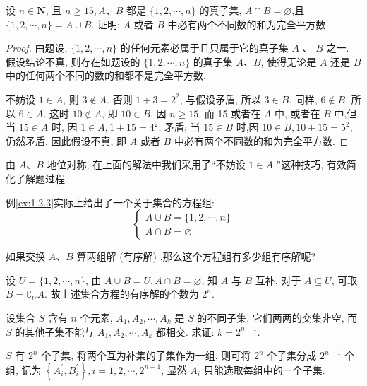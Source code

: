 \begin{example}\label{ex:1.2.3}
	设 $n \in \mathbf{N}$, 且 $n \geqslant 15, A 、 B$ 都是 $\{1,2, \cdots, n\}$ 的真子集, $A \cap B=\varnothing$,且 $\{1,2, \cdots, n\}=A \cup B$. 证明: $A$ 或者 $B$ 中必有两个不同数的和为完全平方数.
\end{example}

\begin{proof}
	由题设, $\{1,2, \cdots, n\}$ 的任何元素必属于且只属于它的真子集 $A$ 、 $B$ 之一. 假设结论不真, 则存在如题设的 $\{1,2, \cdots, n\}$ 的真子集 $A 、 B$, 使得无论是 $A$ 还是 $B$ 中的任何两个不同的数的和都不是完全平方数.

	不妨设 $1 \in A$, 则 $3 \notin A$. 否则 $1+3=2^{2}$, 与假设矛盾, 所以 $3 \in B$. 同样, $6 \notin B$, 所以 $6 \in A$. 这时 $10 \notin A$, 即 $10 \in B$. 因 $n \geqslant 15$, 而 15 或者在 $A$ 中, 或者在 $B$ 中,但当 $15 \in A$ 时, 因 $1 \in A, 1+15=4^{2}$, 矛盾; 当 $15 \in B$ 时,因 $10 \in B, 10+15=5^{2}$, 仍然矛盾. 因此假设不真, 即 $A$ 或者 $B$ 中必有两个不同数的和为完全平方数.
\end{proof}

\begin{note}
	由 $A 、 B$ 地位对称, 在上面的解法中我们采用了“不妨设 $1 \in A$ ”这种技巧, 有效简化了解题过程.
\end{note}

例\ref{ex:1.2.3}实际上给出了一个关于集合的方程组:
$$
	\left\{\begin{array}{l}
		A \cup B=\{1,2, \cdots, n\} \\
		A \cap B=\varnothing
	\end{array}\right.
$$

如果交换 $A 、 B$ 算两组解 (有序解) ,那么这个方程组有多少组有序解呢?

设 $U=\{1,2, \cdots, n\}$, 由 $A \cup B=U, A \cap B=\varnothing$, 知 $A$ 与 $B$ 互补, 对于 $A \subseteq U$, 可取 $B=\complement_{U} A$. 故上述集合方程的有序解的个数为 $2^{n}$.

\begin{example}
	设集合 $S$ 含有 $n$ 个元素, $A_{1}, A_{2}, \cdots, A_{k}$ 是 $S$ 的不同子集, 它们两两的交集非空, 而 $S$ 的其他子集不能与 $A_{1}, A_{2}, \cdots, A_{k}$ 都相交. 求证: $k=2^{n-1}$.
\end{example}

\begin{analysis}
	$S$ 有 $2^{n}$ 个子集, 将两个互为补集的子集作为一组, 则可将 $2^{n}$ 个子集分成 $2^{n-1}$ 个组, 记为 $\left\{A_{i}^{\prime}, B_{i}^{\prime}\right\}, i=1,2, \cdots, 2^{n-1}$, 显然 $A_{i}$ 只能选取每组中的一个子集.
\end{analysis}

